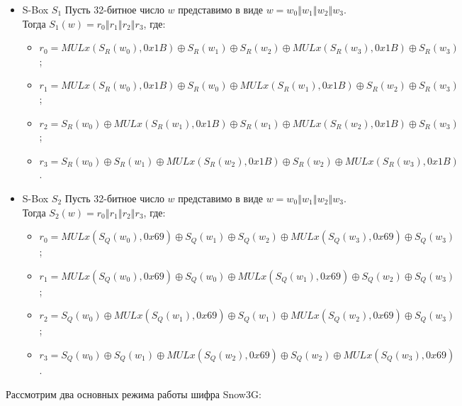 \documentclass{./civarticle}
\begin{document}
\begin{itemize}
    \item S-Box $S_1$
    Пусть 32-битное число $w$ представимо в виде $w = w_0 \mathbin\Vert w_1 \mathbin\Vert w_2 \mathbin\Vert w_3$. Тогда $S_1(w) = r_0 \mathbin\Vert r_1 \mathbin\Vert r_2 \mathbin\Vert r_3$, где:
    \begin{itemize}
        \item $r_0 = MULx(S_R(w_0), 0x1B) \oplus S_R(w_1) \oplus S_R(w_2) \oplus MULx(S_R(w_3), 0x1B) \oplus S_R(w_3)$;
        \item $r_1 = MULx(S_R(w_0), 0x1B) \oplus S_R(w_0) \oplus MULx(S_R(w_1), 0x1B) \oplus S_R(w_2) \oplus S_R(w_3)$;
        \item $r_2 = S_R(w_0)\oplus MULx(S_R(w_1), 0x1B) \oplus S_R(w_1) \oplus MULx(S_R(w_2), 0x1B) \oplus S_R(w_3)$;
        \item $r_3 = S_R(w_0) \oplus S_R(w_1) \oplus MULx(S_R(w_2), 0x1B) \oplus S_R(w_2) \oplus MULx(S_R(w_3), 0x1B)$.
    \end{itemize}
    
    \item S-Box $S_2$
    Пусть 32-битное число $w$ представимо в виде $w = w_0 \mathbin\Vert w_1 \mathbin\Vert w_2 \mathbin\Vert w_3$. Тогда $S_2(w) = r_0 \mathbin\Vert r_1 \mathbin\Vert r_2 \mathbin\Vert r_3$, где:
    \begin{itemize}
        \item $r_0 = MULx(S_Q(w_0), 0x69) \oplus S_Q(w_1) \oplus S_Q(w_2) \oplus MULx(S_Q(w_3), 0x69) \oplus S_Q(w_3)$;
        \item $r_1 = MULx(S_Q(w_0), 0x69) \oplus S_Q(w_0) \oplus MULx(S_Q(w_1), 0x69) \oplus S_Q(w_2) \oplus S_Q(w_3)$;
        \item $r_2 = S_Q(w_0)\oplus MULx(S_Q(w_1), 0x69) \oplus S_Q(w_1) \oplus MULx(S_Q(w_2), 0x69) \oplus S_Q(w_3)$;
        \item $r_3 = S_Q(w_0) \oplus S_Q(w_1) \oplus MULx(S_Q(w_2), 0x69) \oplus S_Q(w_2) \oplus MULx(S_Q(w_3), 0x69)$.
    \end{itemize}
    
\end{itemize}

Рассмотрим два основных режима работы шифра Snow3G:
\end{document}
